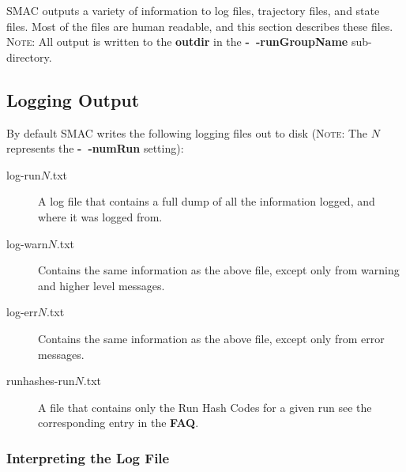 \documentclass[manual.tex]{subfiles}
\begin{document}
\label{sec:output} 

SMAC outputs a variety of information to log files, trajectory files,
and state files. Most of the files are human readable, and this section
describes these files.
\\
\textsc{Note:} All output is written to the \textbf{outdir} in the \textbf{-~$\!$-runGroupName} sub-directory.

\subsection{Logging Output}




By default SMAC writes the following logging files out to disk (\textsc{Note:} The $N$ represents the \textbf{-~$\!$-numRun} setting): 
\begin{description}
\item [{log-run$N$.txt}] A log file that contains a full dump of all the information logged, and where it was logged from.
\item [{log-warn$N$.txt}] Contains the same information as the above file,
except only from warning and higher level messages.
\item [{log-err$N$.txt}] Contains the same information as the above file,
except only from error messages.
\item [{runhashes-run$N$.txt}] A file that contains only the Run Hash Codes for a given run see the corresponding entry in the \textbf{FAQ}.

\end{description}


\subsubsection{Interpreting the Log File}
\end{document}

